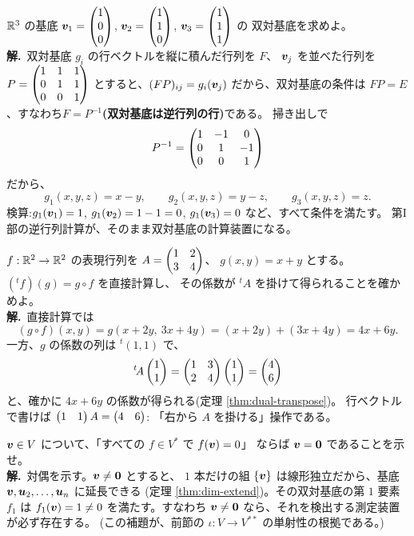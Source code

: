 \begin{rei}[例題・標準(双対基底は逆行列の行)]\label{rei:dual-inv}
$\mathbb{R}^3$ の基底 $\bm{v}_1 = \begin{pmatrix}1 \\ 0 \\ 0\end{pmatrix}$,
$\bm{v}_2 = \begin{pmatrix}1 \\ 1 \\ 0\end{pmatrix}$, $\bm{v}_3 = \begin{pmatrix}1 \\ 1 \\ 1\end{pmatrix}$ の
双対基底を求めよ。\\
\textbf{解.}\ 双対基底 $g_i$ の行ベクトルを縦に積んだ行列を $F$、
$\bm{v}_j$ を並べた行列を $P = \begin{pmatrix}1 & 1 & 1 \\ 0 & 1 & 1 \\ 0 & 0 & 1\end{pmatrix}$
とすると、$(FP)_{ij} = g_i(\bm{v}_j)$ だから、双対基底の条件は
$FP = E$、すなわち\textbf{$F = P^{-1}$(双対基底は逆行列の行)}である。
掃き出しで
\[
P^{-1} = \begin{pmatrix}1 & -1 & 0 \\ 0 & 1 & -1 \\ 0 & 0 & 1\end{pmatrix}
\]
だから、
\[
g_1(x, y, z) = x - y, \qquad g_2(x, y, z) = y - z, \qquad
g_3(x, y, z) = z.
\]
検算:$g_1(\bm{v}_1) = 1$, $g_1(\bm{v}_2) = 1 - 1 = 0$,
$g_1(\bm{v}_3) = 0$ など、すべて条件を満たす。
第I部の逆行列計算が、そのまま双対基底の計算装置になる。
\end{rei}

\begin{rei}[例題・標準(双対写像の計算)]\label{rei:dual-map}
$f : \mathbb{R}^2 \to \mathbb{R}^2$ の表現行列を $A = \begin{pmatrix}1 & 2 \\ 3 & 4\end{pmatrix}$、
$g(x, y) = x + y$ とする。$({}^tf)(g) = g \circ f$ を直接計算し、
その係数が ${}^t\!A$ を掛けて得られることを確かめよ。\\
\textbf{解.}\ 直接計算では
\[
(g \circ f)(x, y) = g(x + 2y,\ 3x + 4y) = (x + 2y) + (3x + 4y) = 4x + 6y.
\]
一方、$g$ の係数の列は ${}^t(1, 1)$ で、
\[
{}^t\!A\begin{pmatrix}1 \\ 1\end{pmatrix} = \begin{pmatrix}1 & 3 \\ 2 & 4\end{pmatrix}\begin{pmatrix}1 \\ 1\end{pmatrix} = \begin{pmatrix}4 \\ 6\end{pmatrix}
\]
と、確かに $4x + 6y$ の係数が得られる(定理 \ref{thm:dual-transpose})。
行ベクトルで書けば $\begin{pmatrix}1 & 1\end{pmatrix}A = \begin{pmatrix}4 & 6\end{pmatrix}$:
「右から $A$ を掛ける」操作である。
\end{rei}

\begin{rei}[例題・標準(証明:分離補題)]\label{rei:dual-sep}
$\bm{v} \in V$ について、「すべての $f \in V^{*}$ で $f(\bm{v}) = 0$」
ならば $\bm{v} = \bm{0}$ であることを示せ。\\
\textbf{解.}\ 対偶を示す。$\bm{v} \neq \bm{0}$ とすると、
$1$ 本だけの組 $\{\bm{v}\}$ は線形独立だから、基底
$\bm{v}, \bm{u}_2, \dots, \bm{u}_n$ に延長できる
(定理 \ref{thm:dim-extend})。その双対基底の第 $1$ 要素 $f_1$ は
$f_1(\bm{v}) = 1 \neq 0$ を満たす。すなわち $\bm{v} \neq \bm{0}$
なら、それを検出する測定装置が必ず存在する。
(この補題が、前節の $\iota : V \to V^{**}$ の単射性の根拠である。)
\end{rei}


